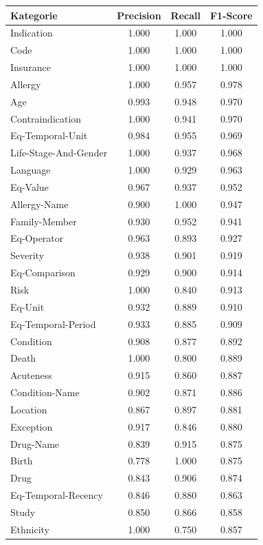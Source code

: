 \begin{table}[htbp]
\centering
\begin{tabular}{p{5cm}ccc}
\toprule
\textbf{Kategorie} & \textbf{Precision} & \textbf{Recall} & \textbf{F1-Score} \\
\midrule
Indication & 1.000 & 1.000 & 1.000 \\
Code & 1.000 & 1.000 & 1.000 \\
Insurance & 1.000 & 1.000 & 1.000 \\
Allergy & 1.000 & 0.957 & 0.978 \\
Age & 0.993 & 0.948 & 0.970 \\
Contraindication & 1.000 & 0.941 & 0.970 \\
Eq-Temporal-Unit & 0.984 & 0.955 & 0.969 \\
Life-Stage-And-Gender & 1.000 & 0.937 & 0.968 \\
Language & 1.000 & 0.929 & 0.963 \\
Eq-Value & 0.967 & 0.937 & 0.952 \\
Allergy-Name & 0.900 & 1.000 & 0.947 \\
Family-Member & 0.930 & 0.952 & 0.941 \\
Eq-Operator & 0.963 & 0.893 & 0.927 \\
Severity & 0.938 & 0.901 & 0.919 \\
Eq-Comparison & 0.929 & 0.900 & 0.914 \\
Risk & 1.000 & 0.840 & 0.913 \\
Eq-Unit & 0.932 & 0.889 & 0.910 \\
Eq-Temporal-Period & 0.933 & 0.885 & 0.909 \\
Condition & 0.908 & 0.877 & 0.892 \\
Death & 1.000 & 0.800 & 0.889 \\
Acuteness & 0.915 & 0.860 & 0.887 \\
Condition-Name & 0.902 & 0.871 & 0.886 \\
Location & 0.867 & 0.897 & 0.881 \\
Exception & 0.917 & 0.846 & 0.880 \\
Drug-Name & 0.839 & 0.915 & 0.875 \\
Birth & 0.778 & 1.000 & 0.875 \\
Drug & 0.843 & 0.906 & 0.874 \\
Eq-Temporal-Recency & 0.846 & 0.880 & 0.863 \\
Study & 0.850 & 0.866 & 0.858 \\
Ethnicity & 1.000 & 0.750 & 0.857 \\

\end{tabular}
\end{table}
